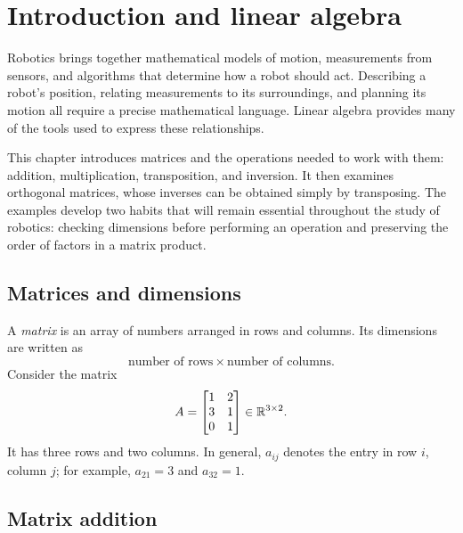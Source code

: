 ﻿\chapter{Introduction and linear algebra}
\label{chap:lecture01}

Robotics brings together mathematical models of motion, measurements from
sensors, and algorithms that determine how a robot should act. Describing a
robot's position, relating measurements to its surroundings, and planning its
motion all require a precise mathematical language. Linear algebra provides
many of the tools used to express these relationships.

This chapter introduces matrices and the operations needed to work with them:
addition, multiplication, transposition, and inversion. It then examines
orthogonal matrices, whose inverses can be obtained simply by transposing.
The examples develop two habits that will remain essential throughout the
study of robotics: checking dimensions before performing an operation and
preserving the order of factors in a matrix product.
\section{Matrices and dimensions}

A \emph{matrix} is an array of numbers arranged in rows and columns. Its
dimensions are written as
\[
  \text{number of rows}\times\text{number of columns}.
\]
Consider the matrix
\begin{equation}
 A=\begin{bmatrix}1&2\\3&1\\0&1\end{bmatrix}\in\mathbb{R}^{3\times2}.
 \label{eq:l01-A}
\end{equation}
It has three rows and two columns. In general, $a_{ij}$ denotes the entry in
row $i$, column $j$; for example, $a_{21}=3$ and $a_{32}=1$.

\section{Matrix addition}

